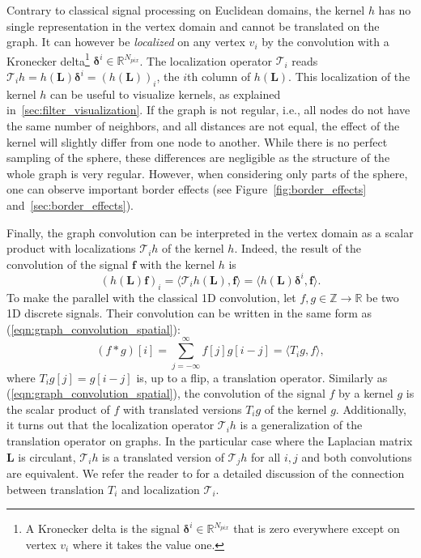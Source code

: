 \documentclass[final,twocolumn,3p,times,sort&compress]{elsarticle}
\newcommand{\figref}[1]{Figure~\ref{fig:#1}}
\newcommand{\eqnref}[1]{(\ref{eqn:#1})}
\renewcommand{\b}[1]{{\bm{#1}}}   %
\newcommand{\1}{\b{1}}              %
\newcommand{\0}{\b{0}}              %
\renewcommand{\L}{\b{L}}
\newcommand{\f}{\b{f}}
\newcommand{\R}{\mathbb{R}}
\newcommand{\T}{\mathcal{T}}
\begin{document}
Contrary to classical signal processing on Euclidean domains, the kernel $h$ has no single representation in the vertex domain and cannot be translated on the graph. It can however be \textit{localized} on any vertex $v_i$ by the convolution with a Kronecker delta\footnote{A Kronecker delta is the signal $\b \delta^i \in \R^{N_{pix}}$ that is zero everywhere except on vertex $v_i$ where it takes the value one.} $\b \delta^i \in \R^{N_{pix}}$. The localization operator $\T_i$ reads $\T_i h = h(\L) \b \delta^i = (h(\L))_i$, the $i$th column of $h(\L)$.
This localization of the kernel $h$ can be useful to visualize kernels, as explained in~\ref{sec:filter_visualization}.
If the graph is not regular, i.e., all nodes do not have the same number of neighbors, and all distances are not equal, the effect of the kernel will slightly differ from one node to another. While there is no perfect sampling of the sphere, these differences are negligible as the structure of the whole graph is very regular. However, when considering only parts of the sphere, one can observe important border effects (see \figref{border_effects} and~\ref{sec:border_effects}).

Finally, the graph convolution can be interpreted in the vertex domain as a scalar product with localizations $\T_i h$ of the kernel $h$. Indeed, the result of the convolution of the signal $\f$ with the kernel $h$ is
\begin{equation} \label{eqn:graph_convolution_spatial}
	(h(\L) \f)_i = \langle \T_i h(\L), \f \rangle = \langle h(\L) \b \delta^i, \f \rangle.
\end{equation}
To make the parallel with the classical 1D convolution, let $f, g\in \mathbb{Z} \rightarrow \mathbb{R}$ be two 1D discrete signals. Their convolution can be written in the same form as \eqnref{graph_convolution_spatial}:
\begin{equation*}
	(f \ast g) [i] = \sum_{j=-\infty}^\infty f[j] g[i-j] = \langle T_i g,  f \rangle,
\end{equation*}
where $T_i g[j] = g[i-j]$ is, up to a flip, a translation operator.
Similarly as \eqnref{graph_convolution_spatial}, the convolution of the signal $f$ by a kernel $g$ is the scalar product of $f$ with translated versions $T_i g$ of the kernel $g$.
Additionally, it turns out that the localization operator $\T_i h$ is a generalization of the translation operator on graphs. In the particular case where the Laplacian matrix $\L$ is circulant, $\T_i h$ is a translated version of $\T_j h$ for all $i, j$ and both convolutions are equivalent. We refer the reader to \citep[Sec 2.2]{perraudin2017stationary} for a detailed discussion of the connection between translation $T_i$ and localization $\T_i$.
\end{document}
